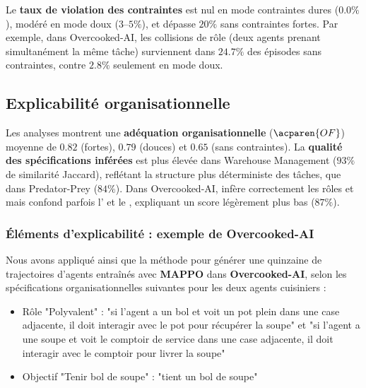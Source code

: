 Le \textbf{taux de violation des contraintes} est nul en mode contraintes dures ($0.0\%$), modéré en mode doux ($3$–$5\%$), et dépasse $20\%$ sans contraintes fortes.
Par exemple, dans Overcooked-AI, les collisions de rôle (deux agents prenant simultanément la même tâche) surviennent dans $24.7\%$ des épisodes sans contraintes, contre $2.8\%$ seulement en mode doux.

\subsection*{Explicabilité organisationnelle}

Les analyses  montrent une \textbf{adéquation organisationnelle} ($\acparen{OF}$) moyenne de $0.82$ (fortes), $0.79$ (douces) et $0.65$ (sans contraintes).
La \textbf{qualité des spécifications inférées} est plus élevée dans Warehouse Management ($93\%$ de similarité Jaccard), reflétant la structure plus déterministe des tâches, que dans Predator-Prey ($84\%$).
Dans Overcooked-AI,  infère correctement les rôles  et  mais confond parfois l' et le , expliquant un score légèrement plus bas ($87\%$).


\subsubsection*{Éléments d'explicabilité : exemple de Overcooked-AI}

Nous avons appliqué  ainsi que la méthode  pour générer une quinzaine de trajectoires d'agents entraînés avec \textbf{MAPPO} dans \textbf{Overcooked-AI}, selon les spécifications organisationnelles suivantes pour les deux agents cuisiniers :
%
\begin{itemize}
  \item Rôle "Polyvalent" : "si l'agent a un bol et voit un pot plein dans une case adjacente, il doit interagir avec le pot pour récupérer la soupe" et "si l'agent a une soupe et voit le comptoir de service dans une case adjacente, il doit interagir avec le comptoir pour livrer la soupe"
  \item Objectif "Tenir bol de soupe" : "tient un bol de soupe"
\end{itemize}

